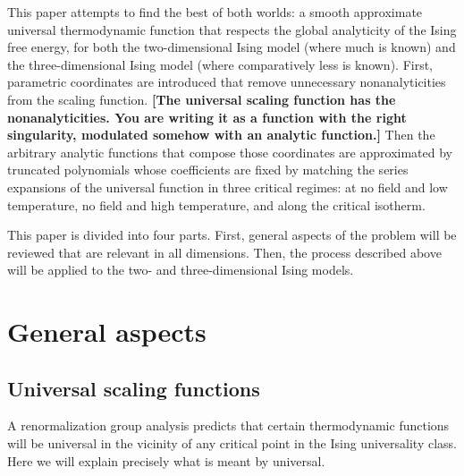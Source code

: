 \documentclass[
  aps,
  pre,
  preprint,
  longbibliography,
  floatfix
]{revtex4-2}
\begin{document}
This paper attempts to find the best of both worlds: a smooth approximate
universal thermodynamic function that respects the global analyticity of the
Ising free energy, for both the two-dimensional Ising model (where much is
known) and the three-dimensional Ising model (where comparatively less is
known). First, parametric coordinates are introduced that remove unnecessary
nonanalyticities from the scaling function. {\bf [The universal scaling function has the nonanalyticities. You are writing it as a function with the right singularity, modulated somehow with an analytic function.]} Then the arbitrary analytic
functions that compose those coordinates are approximated by truncated
polynomials whose coefficients are fixed by matching the series expansions of
the universal function in three critical regimes: at no field and low
temperature, no field and high temperature, and along the critical isotherm.

This paper is divided into four parts. First, general aspects of the problem
will be reviewed that are relevant in all dimensions. Then, the process
described above will be applied to the two- and three-dimensional Ising models.

\section{General aspects}

\subsection{Universal scaling functions}

A renormalization group analysis predicts that certain thermodynamic functions
will be universal in the vicinity of any critical point in the Ising
universality class. Here we will explain precisely what is meant by universal.
\end{document}
